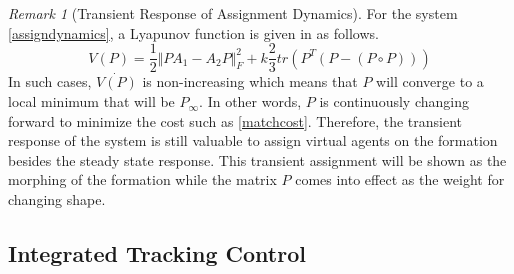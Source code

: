 \documentclass[11pt, a4paper, oneside, openany, reqno]{book}
\theoremstyle{definition}
\theoremstyle{remark}
\newtheorem{remark}[theorem]{Remark}
\numberwithin{equation}{chapter} %
\begin{document}
\begin{remark}[Transient Response of Assignment Dynamics]
	For the system \eqref{assigndynamics}, 
	a Lyapunov function is given in \cite{graphmatch} as follows.
	\begin{equation}
		V(P) = \frac{1}{2} \Vert PA_1 -A_2P \Vert_F^2 
			+k \frac{2}{3} tr \left( P^T \left( P -\left( P \circ P \right) \right)\right)
	\end{equation}
	In such cases, $ \dot{V(P)} $ is non-increasing which means that $ P $
	will converge to a local minimum that will be $ P_\infty $.
	In other words, $ P $ is continuously changing forward to minimize the cost such as \eqref{matchcost}.
	Therefore, the transient response of the system is still valuable 
	to assign virtual agents on the formation besides the steady state response. 
	This transient assignment will be shown as the morphing of the formation
	while the matrix $ P $ comes into effect as the weight for changing shape.
\end{remark}


\subsection{Integrated Tracking Control}
\end{document}
